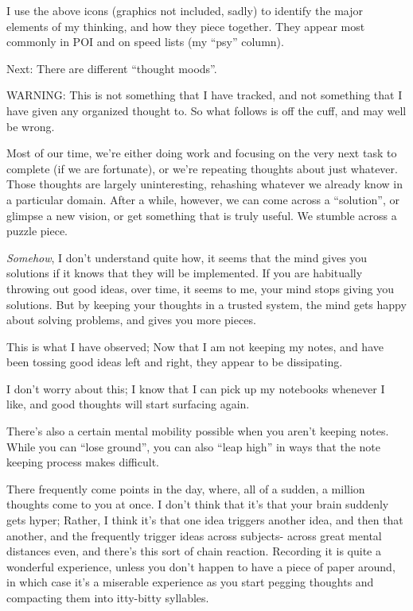 \documentclass[oneside]{book}
\begin{document}
I use the above icons (graphics not included, sadly) to identify the
major elements of my thinking, and how they piece together. They
appear most commonly in POI and on speed lists (my ``psy'' column).


Next: There are different ``thought moods''.

WARNING: This is not something that I have tracked, and not something
that I have given any organized thought to. So what follows is off the
cuff, and may well be wrong.

Most of our time, we're either doing work and focusing on the very
next task to complete (if we are fortunate), or we're repeating
thoughts about just whatever. Those thoughts are largely
uninteresting, rehashing whatever we already know in a particular
domain. After a while, however, we can come across a ``solution'', or
glimpse a new vision, or get something that is truly useful. We
stumble across a puzzle piece.

\emph{Somehow}, I don't understand quite how, it seems that the mind gives
you solutions if it knows that they will be implemented. If you are
habitually throwing out good ideas, over time, it seems to me, your
mind stops giving you solutions. But by keeping your thoughts in a
trusted system, the mind gets happy about solving problems, and gives
you more pieces.

This is what I have observed; Now that I am not keeping my notes, and
have been tossing good ideas left and right, they appear to be
dissipating.

I don't worry about this; I know that I can pick up my notebooks
whenever I like, and good thoughts will start surfacing again.

There's also a certain mental mobility possible when you aren't
keeping notes. While you can ``lose ground'', you can also ``leap high''
in ways that the note keeping process makes difficult.

There frequently come points in the day, where, all of a sudden, a
million thoughts come to you at once. I don't think that it's that
your brain suddenly gets hyper; Rather, I think it's that one idea
triggers another idea, and then that another, and the frequently
trigger ideas across subjects- across great mental distances even, and
there's this sort of chain reaction. Recording it is quite a wonderful
experience, unless you don't happen to have a piece of paper around,
in which case it's a miserable experience as you start pegging
thoughts and compacting them into itty-bitty syllables.
\end{document}
